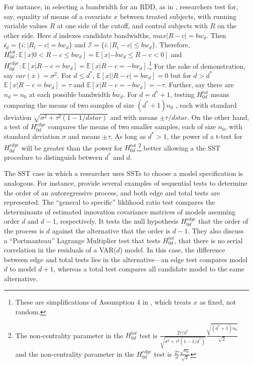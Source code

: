 \documentclass[12pt]{article}\usepackage[]{graphicx}\usepackage[]{color}
\newcommand{\dstar}{d^*}
\newcommand{\hedged}{H_{0d}^{edge}}
\newcommand{\htotd}{H_{0d}^{tot}}
\newcommand{\EE}{\mathbb{E}}
\begin{document}
For instance, in selecting a bandwidth for an RDD, as in
\citet{rocio}, researchers test for, say, equality of means of a
covariate $x$ between treated subjects, with running variable values
$R$ at one
side of the cutoff, and control subjects with $R$ on the other side.
Here $d$ indexes candidate bandwidths, $max |R-c|=bw_d$.
Then $\mathcal{i}_d=\{i: |R_i-c|=bw_d\}$ and $\mathcal{I}=\{i:
|R_i-c|\le bw_d\}$.
Therefore, $\htotd : \EE [x| 0<R-c\le bw_d]=\EE [x|-bw_d \le R-c <0]$
and $\hedged :\EE [x|R-c=bw_d]=\EE [x|
R-c=-bw_d]$.\footnote{These are simplifications of Assumption 4 in
  \citet{rocio}, which treats $x$ as fixed, not random.}
For the sake of demonstration, say $var(x)=\sigma^2$.
For $d \le \dstar$, $\EE [x ||R-c|= bw_d]=0$ but for $d>\dstar$
$\EE[x | R-c = bw_d]=\tau$ and $\EE [x|R-c =-bw_d]=-\tau$.
Further, say there are $n_d=n_0$ at each possible bandwidth $bw_d$.
For $d=\dstar+1$, testing $\htotd$ means comparing the means of two
samples of size $(\dstar+1)n_0$ , each with standard deviation
$\sqrt{\sigma^2+\tau^2(1-1/dstar)}$ and with means $\pm \tau/dstar$.
On the other hand, a test of $\hedged$ compares the means of two
smaller samples, each of size $n_0$, with standard deviation $\sigma$
and means $\pm \tau$.
As long as $\dstar>1$, the power of a t-test for $\hedged$ will be greater
than the power for $\htotd$,\footnote{The non-centrality parameter in
  the $\htotd$ test is
  $\frac{2\tau/\dstar}{\sqrt{\sigma^2+\tau^2(1-1/\dstar)}}\frac{\sqrt{(\dstar+1)n_0}}{\sqrt{2}}$
    and the non-centrality parameter in the $\hedged$ test is
    $\frac{2\tau}{\sigma}\frac{\sqrt{n_0}}{\sqrt{2}}$}
better allowing a the SST procedure to distinguish between $\dstar$
and $d$.

The SST case in which a researcher uses SSTs to choose a model
specification is analogous.
For instance, \citet{ivanov} provide several examples of sequential
tests to determine the order of an autoregressive process, and both
edge and total tests are represented.
The ``general to specific'' liklihood ratio test compares the
determinants of estimated innovation covariance
matrices of models assuming order $d$ and $d-1$, respectively.
It tests the null hypothesis $\hedged$ that the order of the process
is $d$ against the alternative that the order is $d-1$.
They also discuss a ``Portmanteau'' Lagrange Multiplier test that
tests $\htotd$, that there is no serial correlation in the residuals
of a VAR($d$) model.
In this case, the difference between edge and total tests lies in the
alternative---an edge test compares model $d$ to model $d+1$, whereas
a total test compares all candidate model to the same alternative.
\end{document}

